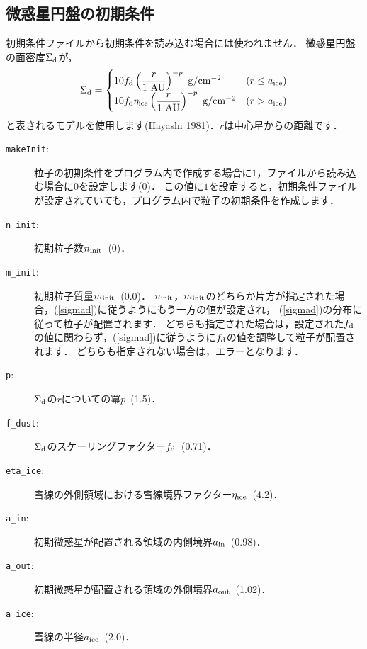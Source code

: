 \documentclass[12pt,a4paper,dvipdfmx]{jsarticle}
\begin{document}
\subsection{微惑星円盤の初期条件}
初期条件ファイルから初期条件を読み込む場合には使われません．
微惑星円盤の面密度$\Sigma_{\rm d}$が，
\begin{equation}
\Sigma_{\rm d}=
\begin{cases}
10f_{\rm d}\left( \displaystyle\frac{r}{1\ {\rm AU}} \right)^{-p}\ {\rm g/cm^{-2}} & (r \leq  a_{\rm ice})\\
10f_{\rm d}\eta_{\rm ice}\left( \displaystyle\frac{r}{1\ {\rm AU}} \right)^{-p}\ {\rm g/cm^{-2}} & (r > a_{\rm ice})
\end{cases}
\label{sigmad}
\end{equation}
と表されるモデルを使用します(Hayashi 1981)．$r$は中心星からの距離です．

\begin{description}
\item[\texttt{makeInit}:]
粒子の初期条件をプログラム内で作成する場合に$1$，ファイルから読み込む場合に$0$を設定します(0)．
この値に$1$を設定すると，初期条件ファイルが設定されていても，プログラム内で粒子の初期条件を作成します．

\item[\texttt{n\_init}:]
初期粒子数$n_{\rm init}$\ (0)．
\item[\texttt{m\_init}:]
初期粒子質量$m_{\rm init}$\ (0.0)．
$n_{\rm init}$，$m_{\rm init}$のどちらか片方が指定された場合，(\ref{sigmad})に従うようにもう一方の値が設定され，
(\ref{sigmad})の分布に従って粒子が配置されます．
どちらも指定された場合は，設定された$f_{\rm d}$の値に関わらず，(\ref{sigmad})に従うように$f_{\rm d}$の値を調整して粒子が配置されます．
どちらも指定されない場合は，エラーとなります．

\item[\texttt{p}:]
$\Sigma_{\rm d}$の$r$についての冪$p$\ (1.5)．
\item[\texttt{f\_dust}:]
$\Sigma_{\rm d}$のスケーリングファクター$f_{\rm d}$\ (0.71)．
\item[\texttt{eta\_ice}:]
雪線の外側領域における雪線境界ファクター$\eta_{\rm ice}$\ (4.2)．
\item[\texttt{a\_in}:]
初期微惑星が配置される領域の内側境界$a_{\rm in}$\ (0.98)．
\item[\texttt{a\_out}:]
初期微惑星が配置される領域の外側境界$a_{\rm out}$\ (1.02)．
\item[\texttt{a\_ice}:]
雪線の半径$a_{\rm ice}$\ (2.0)．
\end{description}
\end{document}
